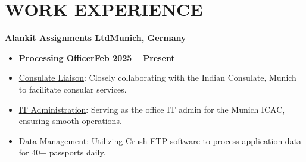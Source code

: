 \documentclass[11pt,a4paper]{article}
\newenvironment{dashlist}{
  \begin{itemize}[label={--}]
}{
  \end{itemize}
}
\begin{document}
\section*{WORK EXPERIENCE}
\noindent\textbf{Alankit Assignments Ltd\hfill Munich, Germany}
\begin{itemize}
\item \textbf{Processing Officer\hfill Feb 2025 – Present}
\end{itemize}
\begin{dashlist}
  \item \uline {Consulate Liaison}: Closely collaborating with the Indian Consulate, Munich to facilitate consular services.
  \item \uline {IT Administration}: Serving as the office IT admin for the Munich ICAC, ensuring smooth operations.
  \item \uline {Data Management}: Utilizing Crush FTP software to process application data for 40+ passports daily.

\end{dashlist}

\medskip
\end{document}
